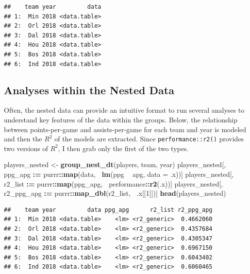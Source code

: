 \documentclass[doc,floatsintext]{apa6}
\newenvironment{Shaded}{\begin{snugshade}}{\end{snugshade}}
\newcommand{\DataTypeTok}[1]{\textcolor[rgb]{0.13,0.29,0.53}{#1}}
\newcommand{\DecValTok}[1]{\textcolor[rgb]{0.00,0.00,0.81}{#1}}
\newcommand{\ErrorTok}[1]{\textcolor[rgb]{0.64,0.00,0.00}{\textbf{#1}}}
\newcommand{\KeywordTok}[1]{\textcolor[rgb]{0.13,0.29,0.53}{\textbf{#1}}}
\newcommand{\NormalTok}[1]{#1}
\newcommand{\OperatorTok}[1]{\textcolor[rgb]{0.81,0.36,0.00}{\textbf{#1}}}
\newcommand{\StringTok}[1]{\textcolor[rgb]{0.31,0.60,0.02}{#1}}
\begin{document}
\begin{verbatim}
##    team year         data
## 1:  Min 2018 <data.table>
## 2:  Orl 2018 <data.table>
## 3:  Dal 2018 <data.table>
## 4:  Hou 2018 <data.table>
## 5:  Bos 2018 <data.table>
## 6:  Ind 2018 <data.table>
\end{verbatim}

\hypertarget{analyses-within-the-nested-data}{%
\subsection{Analyses within the Nested Data}\label{analyses-within-the-nested-data}}

Often, the nested data can provide an intuitive format to run several analyses to understand key features of the data within the groups. Below, the relationship between points-per-game and assists-per-game for each team and year is modeled and then the \(R^2\) of the models are extracted. Since \texttt{performance::r2()} provides two versions of \(R^2\), I then grab only the first of the two types.

\begin{Shaded}
\begin{Highlighting}[]
\NormalTok{players_nested <-}\StringTok{ }\KeywordTok{group_nest_dt}\NormalTok{(players, team, year)}
\NormalTok{players_nested[, ppg_apg    }\OperatorTok{:}\ErrorTok{=}\StringTok{ }\NormalTok{purrr}\OperatorTok{::}\KeywordTok{map}\NormalTok{(data, }\OperatorTok{~}\KeywordTok{lm}\NormalTok{(ppg }\OperatorTok{~}\StringTok{ }\NormalTok{apg, }\DataTypeTok{data =}\NormalTok{ .x))]}
\NormalTok{players_nested[, r2_list    }\OperatorTok{:}\ErrorTok{=}\StringTok{ }\NormalTok{purrr}\OperatorTok{::}\KeywordTok{map}\NormalTok{(ppg_apg, }\OperatorTok{~}\NormalTok{performance}\OperatorTok{::}\KeywordTok{r2}\NormalTok{(.x))]}
\NormalTok{players_nested[, r2_ppg_apg }\OperatorTok{:}\ErrorTok{=}\StringTok{ }\NormalTok{purrr}\OperatorTok{::}\KeywordTok{map_dbl}\NormalTok{(r2_list, }\OperatorTok{~}\NormalTok{.x[[}\DecValTok{1}\NormalTok{]])]}
\KeywordTok{head}\NormalTok{(players_nested)}
\end{Highlighting}
\end{Shaded}

\begin{verbatim}
##    team year         data ppg_apg      r2_list r2_ppg_apg
## 1:  Min 2018 <data.table>    <lm> <r2_generic>  0.4662060
## 2:  Orl 2018 <data.table>    <lm> <r2_generic>  0.4357684
## 3:  Dal 2018 <data.table>    <lm> <r2_generic>  0.4305347
## 4:  Hou 2018 <data.table>    <lm> <r2_generic>  0.6967150
## 5:  Bos 2018 <data.table>    <lm> <r2_generic>  0.6043402
## 6:  Ind 2018 <data.table>    <lm> <r2_generic>  0.6060465
\end{verbatim}
\end{document}
